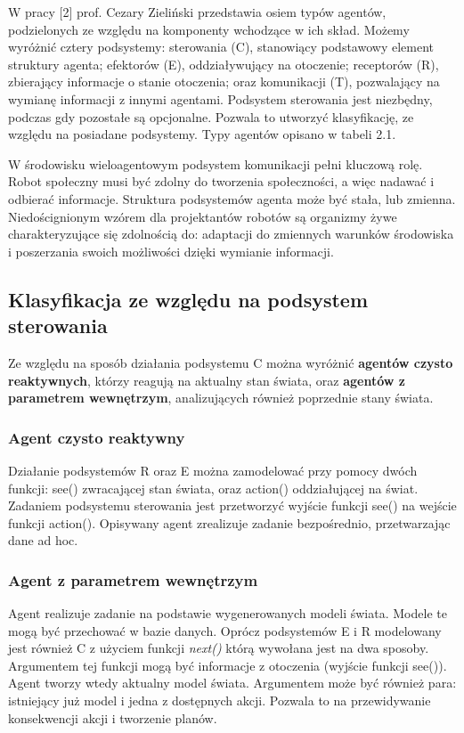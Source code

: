 W pracy [2] prof. Cezary Zieliński przedstawia osiem typów agentów, podzielonych ze względu na komponenty wchodzące w ich skład. Możemy wyróżnić cztery podsystemy: sterowania (C), stanowiący podstawowy element struktury agenta; efektorów (E), oddziaływujący na otoczenie; receptorów (R), zbierający informacje o stanie otoczenia; oraz komunikacji (T), pozwalający na wymianę informacji z innymi agentami. Podsystem sterowania jest niezbędny, podczas gdy pozostałe są opcjonalne. Pozwala to utworzyć klasyfikację, ze względu na posiadane podsystemy. Typy agentów opisano w tabeli 2.1. %

W środowisku wieloagentowym podsystem komunikacji pełni kluczową rolę. Robot społeczny musi być zdolny do tworzenia społeczności, a więc nadawać i odbierać informacje. Struktura podsystemów agenta może być stała, lub zmienna. Niedoścignionym wzórem dla projektantów robotów są organizmy żywe charakteryzujące się zdolnością do: adaptacji do zmiennych warunków środowiska i poszerzania swoich możliwości dzięki wymianie informacji. 

\subsection{Klasyfikacja ze względu na podsystem sterowania}

Ze względu na sposób działania podsystemu C można wyróżnić \textbf{agentów czysto reaktywnych}, którzy reagują na aktualny stan świata, oraz \textbf{agentów z parametrem wewnętrzym}, analizujących również poprzednie stany świata. 

\subsubsection{Agent czysto reaktywny}

Działanie podsystemów R oraz E można zamodelować przy pomocy dwóch funkcji: see() zwracającej stan świata, oraz action() oddziałującej na świat. Zadaniem podsystemu sterowania jest przetworzyć wyjście funkcji see() na wejście funkcji action(). Opisywany agent zrealizuje zadanie bezpośrednio, przetwarzając dane ad hoc.

\subsubsection{Agent z parametrem wewnętrzym}

Agent realizuje zadanie na podstawie wygenerowanych modeli świata. Modele te mogą być przechować w bazie danych. Oprócz podsystemów E i R modelowany jest również C z użyciem funkcji \textit{next()} którą wywołana jest na dwa sposoby. Argumentem tej funkcji mogą być informacje z otoczenia (wyjście funkcji see()). Agent tworzy wtedy aktualny model świata. Argumentem może być również para: istniejący już model i jedna z dostępnych akcji. Pozwala to na przewidywanie konsekwencji akcji i tworzenie planów. 

